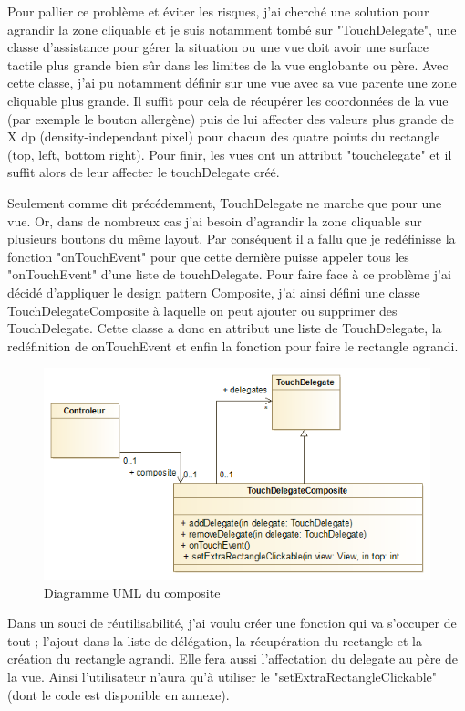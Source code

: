 Pour pallier ce problème et éviter les risques, j'ai cherché une solution pour agrandir la zone cliquable et je suis notamment tombé sur "TouchDelegate", une classe d'assistance pour gérer la situation ou une vue doit avoir une surface tactile plus grande bien sûr dans les limites de la vue englobante ou père. Avec cette classe, j'ai pu notamment définir sur une vue avec sa vue parente une zone cliquable plus grande. Il suffit pour cela de récupérer les coordonnées de la vue (par exemple le bouton allergène) puis de lui affecter des valeurs plus grande de X dp (density-independant pixel) pour chacun des quatre points du rectangle (top, left, bottom right). Pour finir, les vues ont un attribut "touchelegate" et il suffit alors de leur affecter le touchDelegate créé.

Seulement comme dit précédemment, TouchDelegate ne marche que pour une vue. Or, dans de nombreux cas j'ai besoin d'agrandir la zone cliquable sur plusieurs boutons du même layout. Par conséquent il a fallu que je redéfinisse la fonction "onTouchEvent" pour que cette dernière puisse appeler tous les "onTouchEvent" d'une liste de touchDelegate.
Pour faire face à ce problème j'ai décidé d'appliquer le design pattern Composite, j'ai ainsi défini une classe TouchDelegateComposite à laquelle on peut ajouter ou supprimer des TouchDelegate. Cette classe a donc en attribut une liste de TouchDelegate, la redéfinition de onTouchEvent et enfin la fonction pour faire le rectangle agrandi.

\begin{figure}[!htb]
  \centering
  \includegraphics[width=115mm,scale=0.5]{images/diagramme_composite.png}
  \caption{Diagramme UML du composite}
  \label{fig:boat1}
\end{figure}

Dans un souci de réutilisabilité, j'ai voulu créer une fonction qui va s'occuper de tout ; l'ajout dans la liste de délégation, la récupération du rectangle et la création du rectangle agrandi. Elle fera aussi l'affectation du delegate au père de la vue. Ainsi l'utilisateur n'aura qu'à utiliser le "setExtraRectangleClickable" (dont le code est disponible en annexe).

